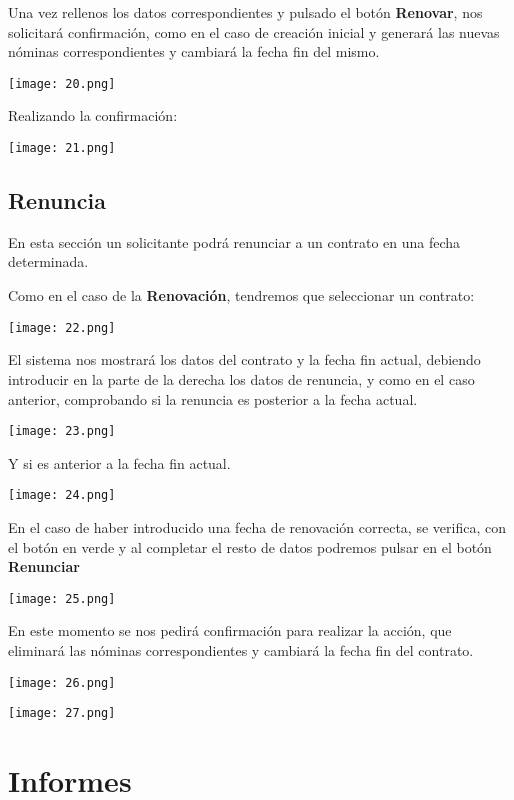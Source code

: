 Una vez rellenos los datos correspondientes y pulsado el botón
\textbf{Renovar}, nos solicitará confirmación, como en el caso de
creación inicial y generará las nuevas nóminas correspondientes y
cambiará la fecha fin del mismo.

\texttt{[image: 20.png]}

Realizando la confirmación:

\texttt{[image: 21.png]}

\subsection{Renuncia}\label{renuncia}

En esta sección un solicitante podrá renunciar a un contrato en una
fecha determinada.

Como en el caso de la \textbf{Renovación}, tendremos que  seleccionar un contrato:

\texttt{[image: 22.png]}

El sistema nos mostrará los datos del contrato y la fecha fin actual, debiendo introducir en la parte de la derecha los datos de renuncia, y como en el caso anterior, comprobando si la renuncia es posterior a la fecha actual.

\texttt{[image: 23.png]}

Y si es anterior a la fecha fin actual.

\texttt{[image: 24.png]}

En el caso de haber introducido una fecha de renovación correcta, se verifica, con el botón en verde y al completar el resto de datos
podremos pulsar en el botón \textbf{Renunciar}

\texttt{[image: 25.png]}

En este momento se nos pedirá confirmación para realizar la acción, que eliminará las nóminas correspondientes y cambiará la fecha fin del contrato.

\texttt{[image: 26.png]}

\texttt{[image: 27.png]}

\section{Informes}\label{informes}

